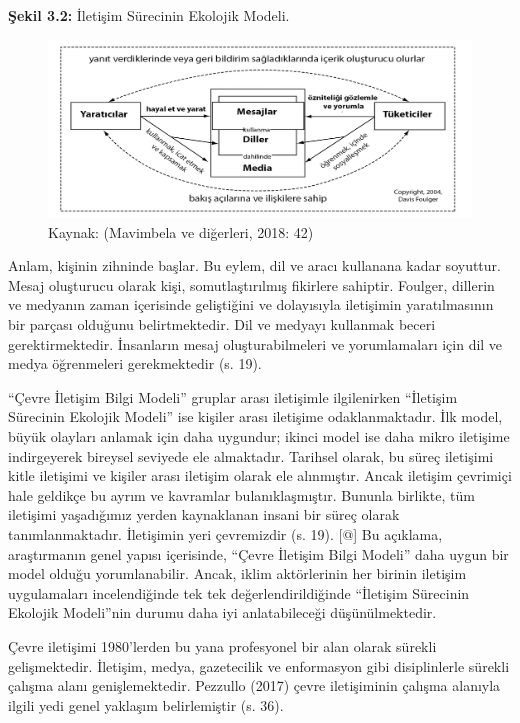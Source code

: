\documentclass[
]{book}
\begin{document}
\textbf{Şekil 3.2:} İletişim Sürecinin Ekolojik Modeli.

\begin{figure}
\includegraphics[width=0.95\linewidth,height=0.95\textheight]{tablolar-sekiller/sekil-3-2} \caption{Kaynak: (Mavimbela ve diğerleri, 2018: 42)}\label{fig:unnamed-chunk-2}
\end{figure}

Anlam, kişinin zihninde başlar. Bu eylem, dil ve aracı kullanana kadar soyuttur. Mesaj oluşturucu olarak kişi, somutlaştırılmış fikirlere sahiptir. Foulger, dillerin ve medyanın zaman içerisinde geliştiğini ve dolayısıyla iletişimin yaratılmasının bir parçası olduğunu belirtmektedir. Dil ve medyayı kullanmak beceri gerektirmektedir. İnsanların mesaj oluşturabilmeleri ve yorumlamaları için dil ve medya öğrenmeleri gerekmektedir (s. 19). \citep{jurin2010environmental}

``Çevre İletişim Bilgi Modeli'' gruplar arası iletişimle ilgilenirken ``İletişim Sürecinin Ekolojik Modeli'' ise kişiler arası iletişime odaklanmaktadır. İlk model, büyük olayları anlamak için daha uygundur; ikinci model ise daha mikro iletişime indirgeyerek bireysel seviyede ele almaktadır. Tarihsel olarak, bu süreç iletişimi kitle iletişimi ve kişiler arası iletişim olarak ele alınmıştır. Ancak iletişim çevrimiçi hale geldikçe bu ayrım ve kavramlar bulanıklaşmıştır. Bununla birlikte, tüm iletişimi yaşadığımız yerden kaynaklanan insani bir süreç olarak tanımlanmaktadır. İletişimin yeri çevremizdir (s. 19). {[}@\citep{jurin2010environmental}{]} Bu açıklama, araştırmanın genel yapısı içerisinde, ``Çevre İletişim Bilgi Modeli'' daha uygun bir model olduğu yorumlanabilir. Ancak, iklim aktörlerinin her birinin iletişim uygulamaları incelendiğinde tek tek değerlendirildiğinde ``İletişim Sürecinin Ekolojik Modeli''nin durumu daha iyi anlatabileceği düşünülmektedir.

Çevre iletişimi 1980'lerden bu yana profesyonel bir alan olarak sürekli gelişmektedir. İletişim, medya, gazetecilik ve enformasyon gibi disiplinlerle sürekli çalışma alanı genişlemektedir. Pezzullo (2017) çevre iletişiminin çalışma alanıyla ilgili yedi genel yaklaşım belirlemiştir (s. 36). \citep{cox2018}
\end{document}
